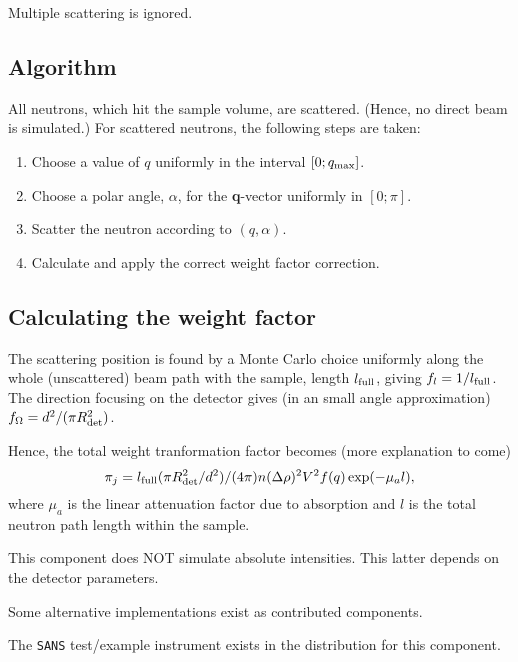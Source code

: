 Multiple scattering is ignored.

\subsection{Algorithm}
All neutrons, which hit the sample volume, are scattered.
(Hence, no direct beam is simulated.)
For scattered neutrons, the following steps are taken:
\begin{enumerate}
\item Choose a value of $q$ uniformly in the interval $[0;q_{\rm max}]$.
\item Choose a polar angle, $\alpha$,
  for the {\bf q}-vector uniformly in $[0;\pi]$.
\item Scatter the neutron according to $(q,\alpha)$.
\item Calculate and apply the correct weight factor correction.
\end{enumerate}

\subsection{Calculating the weight factor}
The scattering position is found by a Monte Carlo choice uniformly
along the whole (unscattered) beam path with the sample, length $l_{\rm full}$, giving
$f_l = 1/l_{\rm full}$. The direction focusing on the detector gives
(in an small angle approximation) $f_\Omega = d^2 / (\pi R_{\rm det}^2)$.

Hence, the total weight tranformation factor becomes (more explanation to come)
\begin{equation}
\pi_j = l_{\rm full} (\pi R_{\rm det}^2 / d^2)/(4 \pi)
  n (\Delta\rho)^2 V^2 f(q) \exp(-\mu_a l) ,
\end{equation}
where $\mu_a$ is the linear attenuation factor due to absorption
and $l$ is the total neutron path length within the sample.

This component does NOT simulate absolute intensities. This latter depends on the detector parameters. 

Some alternative implementations exist as contributed components.

The \verb+SANS+ test/example instrument exists in the distribution for this component.